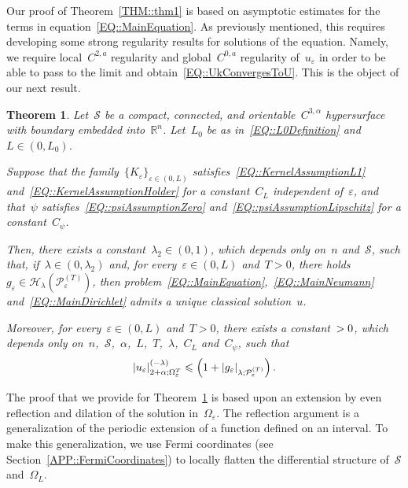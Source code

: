 \documentclass[12pt,a4paper]{amsart}
\makeatletter
\numberwithin{equation}{section}
\newtheorem{theorem}{Theorem}[section]
\theoremstyle{definition}
\theoremstyle{remark}
\newcommand{\R}{\mathbb{R}}
\newcommand{\eps}{\varepsilon}
\newcommand{\abs}[1]{\left\lvert#1\right\rvert}
\renewcommand{\leq}{\leqslant}
\newcommand{\const}[1]{%
  \csname const@#1\endcsname%
}
\makeatother
\begin{document}
Our proof of Theorem~\ref{THM::thm1} is based on asymptotic estimates for the terms in equation~\eqref{EQ::MainEquation}. As previously mentioned, this requires developing some strong regularity results for solutions of the equation. Namely, we require local~$C^{2,a}$ regularity and global~$C^{0,a}$ regularity of~$u_\eps$ in order to be able to pass to the limit and obtain~\eqref{EQ::UkConvergesToU}. This is the object of our next result.

\begin{theorem}\label{THM::epsIndependentRegularity}
    Let~$\mathcal{S}$ be a compact, connected, and orientable~$C^{3,\alpha}$ hypersurface with boundary embedded into~$\R^n$. Let~$L_0$ be as in~\eqref{EQ::L0Definition} and~$L \in (0,L_0)$.
    
    Suppose that the family~${\{K_\eps\}}_{\eps \in (0,L)}$ satisfies~\eqref{EQ::KernelAssumptionL1} and~\eqref{EQ::KernelAssumptionHolder} for a constant~$C_L$ independent of~$\eps$, and that~$\psi$ satisfies~\eqref{EQ::psiAssumptionZero} and~\eqref{EQ::psiAssumptionLipschitz} for a constant~$C_\psi$.
    
    Then, there exists a constant~$\lambda_2 \in (0,1)$, which depends only on~$n$ and~$\mathcal{S}$, such that, if~$\lambda \in (0,\lambda_2)$ and, for every~$\eps \in (0,L)$ and~$T>0$, there holds~$g_\eps \in \mathcal{H}_\lambda(\mathcal{P}_\eps^{(T)})$, then problem~\eqref{EQ::MainEquation},~\eqref{EQ::MainNeumann} and~\eqref{EQ::MainDirichlet} admits a unique classical solution~$u$.
    
    Moreover, for every~$\eps \in (0,L)$ and~$T>0$, there exists a constant~$\const{CONST::UniformRegularity} > 0$, which depends only on~$n$,~$\mathcal{S}$,~$\alpha$,~$L$,~$T$,~$\lambda$,~$C_L$ and~$C_\psi$, such that
    \begin{equation}\label{EQ::NonlinearSchauderEpsilon}
        \abs{u_\eps}_{2+\alpha; \Omega_\eps^T}^{(-\lambda)} \leq \const{CONST::UniformRegularity}\left(1+\abs{g_\eps}_{\lambda; \mathcal{P}_\eps^{(T)}}\right).
    \end{equation}
\end{theorem}

The proof that we provide for Theorem~\ref{THM::epsIndependentRegularity} is based upon an extension by even reflection and dilation of the solution in~$\Omega_\eps$. The reflection argument is a generalization of the periodic extension of a function defined on an interval. To make this generalization, we use Fermi coordinates (see Section~\ref{APP::FermiCoordinates}) to locally flatten the differential structure of~$\mathcal{S}$ and~$\Omega_L$.
\end{document}
